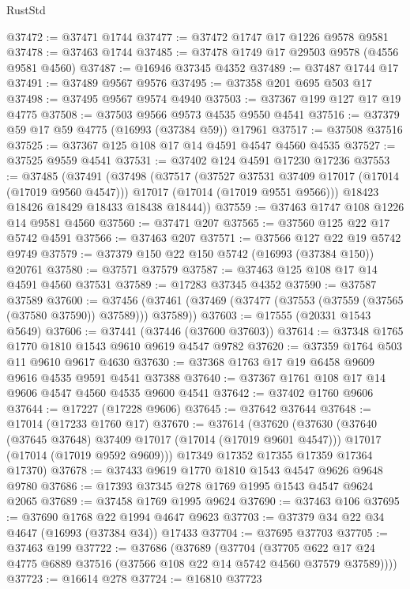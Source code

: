 \begin{lexlean}{RustStd}
\begin{coremodule}
{\begin{coremodule}
{{{{{{{{{{{{{{{{{{{{{{{{{{{{{{{{{{{{{{{{{{{{{{{{{{{{{{{@37472 := @37471 @1744
@37477 := @37472 @1747 @17 @1226 @9578 @9581
@37478 := @37463 @1744
@37485 := @37478 @1749 @17 @29503 @9578 (@4556 @9581 @4560)
@37487 := @16946 @37345 @4352
@37489 := @37487 @1744 @17
@37491 := @37489 @9567 @9576
@37495 := @37358 @201 @695 @503 @17
@37498 := @37495 @9567 @9574 @4940
@37503 := @37367 @199 @127 @17 @19 @4775
@37508 := @37503 @9566 @9573 @4535 @9550 @4541
@37516 := @37379 @59 @17 @59 @4775 (@16993 (@37384 @59)) @17961
@37517 := @37508 @37516
@37525 := @37367 @125 @108 @17 @14 @4591 @4547 @4560 @4535
@37527 := @37525 @9559 @4541
@37531 := @37402 @124 @4591 @17230 @17236
@37553 := @37485
    (@37491
      (@37498
        (@37517
          (@37527 @37531 @37409 @17017 (@17014 (@17019 @9560 @4547)))
          @17017
          (@17014 (@17019 @9551 @9566)))
        @18423
        @18426
        @18429
        @18433
        @18438
        @18444))
@37559 := @37463 @1747 @108 @1226 @14 @9581 @4560
@37560 := @37471 @207
@37565 := @37560 @125 @22 @17 @5742 @4591
@37566 := @37463 @207
@37571 := @37566 @127 @22 @19 @5742 @9749
@37579 := @37379 @150 @22 @150 @5742 (@16993 (@37384 @150)) @20761
@37580 := @37571 @37579
@37587 := @37463 @125 @108 @17 @14 @4591 @4560 @37531
@37589 := @17283 @37345 @4352
@37590 := @37587 @37589
@37600 := @37456 (@37461 (@37469 (@37477 (@37553 (@37559 (@37565 (@37580 @37590)) @37589))) @37589))
@37603 := @17555 (@20331 @1543 @5649)
@37606 := @37441 (@37446 (@37600 @37603))
@37614 := @37348 @1765 @1770 @1810 @1543 @9610 @9619 @4547 @9782
@37620 := @37359 @1764 @503 @11 @9610 @9617 @4630
@37630 := @37368 @1763 @17 @19 @6458 @9609 @9616 @4535 @9591 @4541 @37388
@37640 := @37367 @1761 @108 @17 @14 @9606 @4547 @4560 @4535 @9600 @4541
@37642 := @37402 @1760 @9606
@37644 := @17227 (@17228 @9606)
@37645 := @37642 @37644
@37648 := @17014 (@17233 @1760 @17)
@37670 := @37614
    (@37620
      (@37630
        (@37640 (@37645 @37648) @37409 @17017 (@17014 (@17019 @9601 @4547)))
        @17017
        (@17014 (@17019 @9592 @9609)))
      @17349
      @17352
      @17355
      @17359
      @17364
      @17370)
@37678 := @37433 @9619 @1770 @1810 @1543 @4547 @9626 @9648 @9780
@37686 := @17393 @37345 @278 @1769 @1995 @1543 @4547 @9624 @2065
@37689 := @37458 @1769 @1995 @9624
@37690 := @37463 @106
@37695 := @37690 @1768 @22 @1994 @4647 @9623
@37703 := @37379 @34 @22 @34 @4647 (@16993 (@37384 @34)) @17433
@37704 := @37695 @37703
@37705 := @37463 @199
@37722 := @37686
    (@37689
      (@37704
        (@37705 @622 @17 @24 @4775 @6889 @37516 (@37566 @108 @22 @14 @5742 @4560 @37579 @37589))))
@37723 := @16614 @278
@37724 := @16810 @37723
}}}}}}}}}}}}}}}}}}}}}}}}}}}}}}}}}}}}}}}}}}}}}}}}}}}}}}}
\end{coremodule}}
\end{coremodule}
\end{lexlean}
